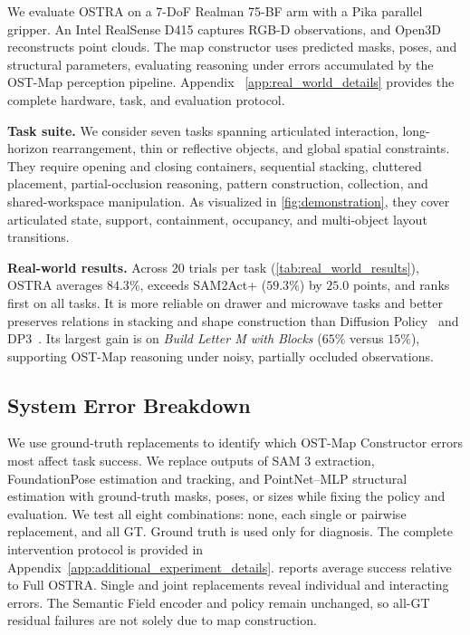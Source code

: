 We evaluate OSTRA on a 7-DoF Realman 75-BF arm with a Pika parallel gripper.
An Intel RealSense D415 captures RGB-D observations, and
Open3D~\citep{Zhou2018Open3D} reconstructs point clouds. The map constructor
uses predicted masks, poses, and structural parameters, evaluating reasoning
under errors accumulated by the OST-Map perception pipeline. Appendix
~\ref{app:real_world_details} provides the complete hardware, task, and
evaluation protocol.

\textbf{Task suite.}
We consider seven tasks spanning articulated interaction, long-horizon
rearrangement, thin or reflective objects, and global spatial constraints.
They require opening and closing containers, sequential stacking, cluttered
placement, partial-occlusion reasoning, pattern construction, collection, and
shared-workspace manipulation. As visualized in \cref{fig:demonstration}, they
cover articulated state, support, containment, occupancy, and multi-object
layout transitions.

\textbf{Real-world results.}
Across 20 trials per task (\cref{tab:real_world_results}), OSTRA averages
$84.3\%$, exceeds SAM2Act+ ($59.3\%$) by $25.0$ points, and ranks first on all
tasks. It is more reliable on drawer and microwave tasks and better preserves
relations in stacking and shape construction than Diffusion
Policy~\citep{chi2024diffusionpolicy} and DP3~\citep{Ze2024DP3}. Its largest
gain is on \textit{Build Letter M with Blocks} ($65\%$ versus $15\%$), supporting
OST-Map reasoning under noisy, partially occluded observations.

\subsection{System Error Breakdown}
\label{sec:system_error_breakdown}

We use ground-truth replacements to identify which OST-Map Constructor errors
most affect task success.
We replace outputs of SAM 3 extraction, FoundationPose estimation and tracking,
and PointNet--MLP structural estimation with ground-truth masks, poses, or
sizes while fixing the policy and evaluation. We test all eight combinations:
none, each single or pairwise replacement, and all GT. Ground truth is used
only for diagnosis. The complete intervention protocol is provided in
Appendix~\ref{app:additional_experiment_details}.
 reports average success relative to Full OSTRA.
Single and joint replacements reveal individual and interacting errors. The
Semantic Field encoder and policy remain unchanged, so all-GT residual failures
are not solely due to map construction.

